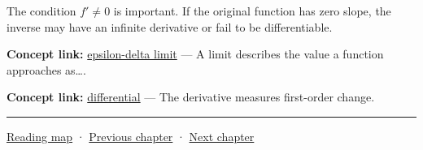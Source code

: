 The condition \(f'\ne0\) is important. If the original function has zero slope, the inverse may have an infinite derivative or fail to be differentiable.

\textbf{Concept link:} \hyperref[01-foundations-i-ch020-functions-limits-continuity-and-scalar-change]{epsilon-delta limit} --- A limit describes the value a function approaches as\ldots.

\textbf{Concept link:} \hyperref[01-foundations-i-ch020-functions-limits-continuity-and-scalar-change]{differential} --- The derivative measures first-order change.

\begin{center}\rule{0.5\linewidth}{0.5pt}\end{center}

\hyperref[volume-reading-map]{Reading map} · \hyperref[01-foundations-i-ch019-coordinate-frames-and-linear-systems]{Previous chapter} · \hyperref[02-foundations-ii-ch021-multivariable-derivatives-and-sensitivity]{Next chapter}
